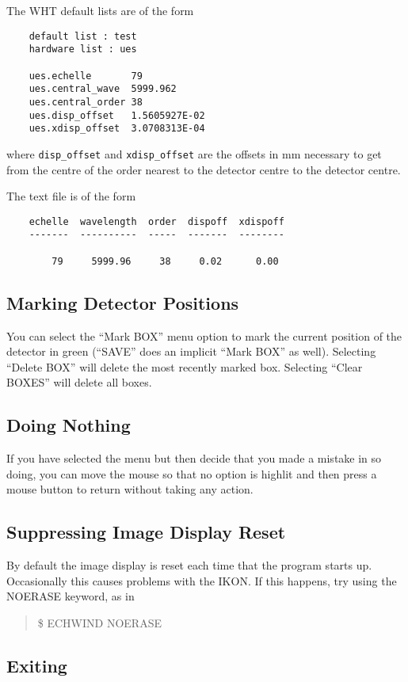 The WHT default lists are of the form
\begin{verbatim}
    default list : test
    hardware list : ues

    ues.echelle       79
    ues.central_wave  5999.962
    ues.central_order 38
    ues.disp_offset   1.5605927E-02
    ues.xdisp_offset  3.0708313E-04
\end{verbatim}
where {\tt disp\_offset} and {\tt xdisp\_offset} are the offsets in mm
necessary to get from the centre of the order nearest to the detector centre to
the detector centre.

The text file is of the form
\begin{verbatim}
    echelle  wavelength  order  dispoff  xdispoff
    -------  ----------  -----  -------  --------

        79     5999.96     38     0.02      0.00
\end{verbatim}

\subsection{Marking Detector Positions}

You can select the ``Mark BOX'' menu option to mark the current position of the
detector in green (``SAVE'' does an implicit ``Mark BOX'' as well). Selecting
``Delete BOX'' will delete the most recently marked box. Selecting ``Clear
BOXES'' will delete all boxes.

\subsection{Doing Nothing}

If you have selected the menu but then decide that you made a mistake in so
doing, you can move the mouse so that no option is highlit and then press a
mouse button to return without taking any action.

\subsection{Suppressing Image Display Reset}

By default the image display is reset each time that the program starts up.
Occasionally this causes problems with the IKON. If this happens, try using the
NOERASE keyword, as in
\begin{quote}
\$ ECHWIND NOERASE
\end{quote}

\subsection{Exiting}

